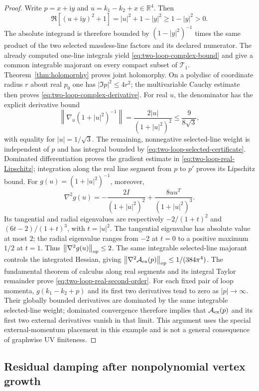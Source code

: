 \documentclass[final,5p,times,twocolumn,numbers,nopreprintline]{elsarticle}
\numberwithin{equation}{section}
\theoremstyle{definition}
\theoremstyle{remark}
\newcommand{\ii}{\mathrm i}
\newcommand{\RR}{\mathbb R}
\newcommand{\norm}[1]{\left\lVert #1\right\rVert}
\begin{document}
\begin{proof}
Write $p=x+\ii y$ and $u=k_1-k_2+x\in\RR^4$. Then
\[
 \Re[(u+\ii y)^2+1]=|u|^2+1-|y|^2
 \geq1-|y|^2>0.
\]
The absolute integrand is therefore bounded by
$(1-|y|^2)^{-1}$ times the same product of the two selected
massless-line factors and its declared numerator. The already
computed one-line integrals yield
\eqref{eq:two-loop-complex-bound} and give a common integrable
majorant on every compact subset of $\mathcal T_1$.
Theorem~\ref{thm:holomorphy} proves joint holomorphy. On a
polydisc of coordinate radius $r$ about real $p_0$ one has
$|\Im p|^2\leq4r^2$; the multivariable Cauchy estimate
then proves \eqref{eq:two-loop-complex-derivative}.
For real $u$, the denominator has the explicit derivative bound
\[
 \norm{\nabla_u(1+|u|^2)^{-1}}
 =\frac{2|u|}{(1+|u|^2)^2}
 \leq\frac9{8\sqrt3},
\]
with equality for $|u|=1/\sqrt3$. The remaining, nonnegative
selected-line weight is independent of $p$ and has integral bounded
by \eqref{eq:two-loop-selected-certificate}. Dominated
differentiation proves the gradient estimate in
\eqref{eq:two-loop-real-Lipschitz}; integration along the real
line segment from $p$ to $p'$ proves its Lipschitz bound.
For $g(u)=(1+|u|^2)^{-1}$, moreover,
\[
 \nabla^2g(u)=-\frac{2I}{(1+|u|^2)^2}
             +\frac{8uu^T}{(1+|u|^2)^3}.
\]
Its tangential and radial eigenvalues are respectively
$-2/(1+t)^2$ and $(6t-2)/(1+t)^3$, with $t=|u|^2$.
The tangential eigenvalue has absolute value at most $2$; the radial
eigenvalue ranges from $-2$ at $t=0$ to a positive maximum $1/2$
at $t=1$. Thus $\norm{\nabla^2g(u)}_{\rm op}\leq2$.
The same integrable selected-line majorant controls the integrated
Hessian, giving
$\norm{\nabla^2\mathcal A_{\rm ex}(p)}_{\rm op}
\leq1/(384\pi^4)$. The fundamental theorem of calculus along
real segments and its integral Taylor remainder prove
\eqref{eq:two-loop-real-second-order}. For each fixed pair of loop momenta, $g(k_1-k_2+p)$ and its
first two derivatives tend to zero as $|p|\to\infty$.
Their globally bounded derivatives are dominated by the same
integrable selected-line weight; dominated convergence therefore
implies that $\mathcal A_{\rm ex}(p)$ and its first two
external derivatives vanish in that limit. This argument uses the
special external-momentum placement in this example and is not a
general consequence of graphwise UV finiteness.
\end{proof}

\subsection{Residual damping after nonpolynomial vertex growth}
\label{sec:residual-damping}
\end{document}
